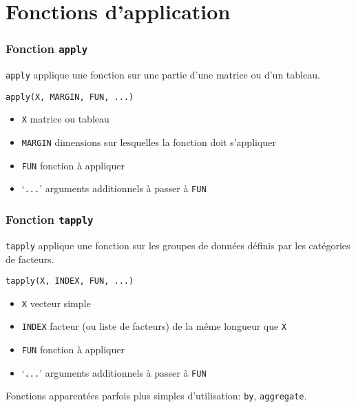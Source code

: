 \section{Fonctions d'application}

\begin{frame}[fragile]
  \frametitle{Fonction \texttt{apply}}

  \texttt{apply} applique une fonction sur une partie d'une
  \alert{matrice} ou d'un \alert{tableau}.
  \begin{Schunk}
    \verb=apply(X, MARGIN, FUN, ...)=
  \end{Schunk}
  \begin{itemize}
  \item \texttt{X} matrice ou tableau
  \item \texttt{MARGIN} dimensions sur lesquelles la fonction doit
    s'appliquer
  \item \texttt{FUN} fonction à appliquer
  \item `\texttt{...}' arguments additionnels à passer à \texttt{FUN}
  \end{itemize}

  \pause
\end{frame}

\begin{frame}[fragile=singleslide]
  \frametitle{Fonction \texttt{tapply}}

  \texttt{tapply} applique une fonction sur les \alert{groupes de données}
  définis par les catégories de \alert{facteurs}.
  \begin{Schunk}
    \verb=tapply(X, INDEX, FUN, ...)=
  \end{Schunk}
  \begin{itemize}
  \item \texttt{X} vecteur simple
  \item \texttt{INDEX} facteur (ou liste de facteurs) de la même longueur que \texttt{X}
  \item \texttt{FUN} fonction à appliquer
  \item `\texttt{...}' arguments additionnels à passer à \texttt{FUN}
  \end{itemize}

  Fonctions apparentées parfois plus simples d'utilisation:
  \texttt{by}, \texttt{aggregate}.
\end{frame}

